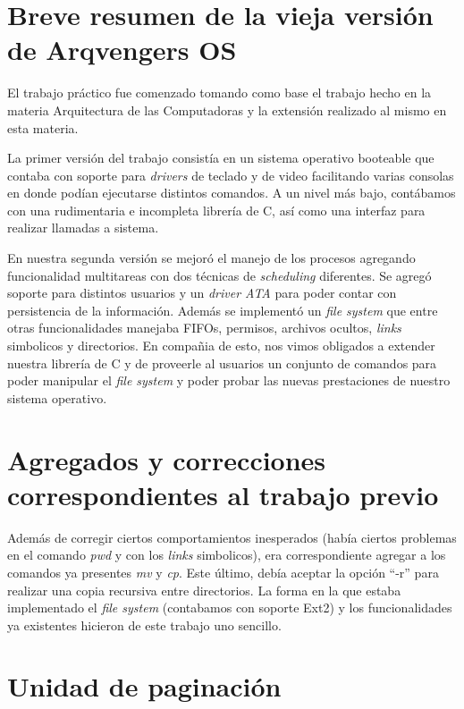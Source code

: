 \documentclass[a4paper,10pt]{article}
\begin{document}
\newpage
\section{Breve resumen de la vieja versión de Arqvengers OS}
El trabajo práctico fue comenzado tomando como base el trabajo hecho en la materia Arquitectura de las Computadoras y la extensión 
realizado al mismo en esta materia.

 La primer versión del trabajo consistía en un sistema operativo booteable que contaba con soporte para \textit{drivers} de
  teclado y de video facilitando varias consolas en donde podían ejecutarse distintos comandos. 
  A un nivel más bajo, contábamos con una rudimentaria e incompleta librería de C, así como una interfaz para realizar
  llamadas a sistema.

En nuestra segunda versión se mejoró el manejo de los procesos agregando funcionalidad multitareas con dos técnicas de 
\textit{scheduling} diferentes. Se agregó soporte para distintos usuarios y un \textit{driver ATA} para poder contar con persistencia 
de la información. Además se implementó un \textit{file system} que entre otras funcionalidades manejaba FIFOs, permisos, 
archivos ocultos, \textit{links} simbolicos y directorios. En compañia de esto, nos vimos obligados a extender nuestra librería de 
C y de proveerle al usuarios un conjunto de comandos para poder manipular el \textit{file system} y poder probar las nuevas 
prestaciones de nuestro sistema operativo.

\newpage

\section{Agregados y correcciones correspondientes al trabajo previo}

Además de corregir ciertos comportamientos inesperados (había ciertos problemas en el comando \textit{pwd} y con los
\textit{links} simbolicos), era correspondiente agregar a los comandos ya presentes \textit{mv} y \textit{cp}. Este último, 
debía aceptar la opción ``-r'' para realizar una copia recursiva entre directorios. La forma en la que estaba implementado 
el \textit{file system} (contabamos con soporte Ext2) y los funcionalidades ya existentes hicieron de este trabajo uno sencillo.

\newpage

\section{Unidad de paginación}
\end{document}
